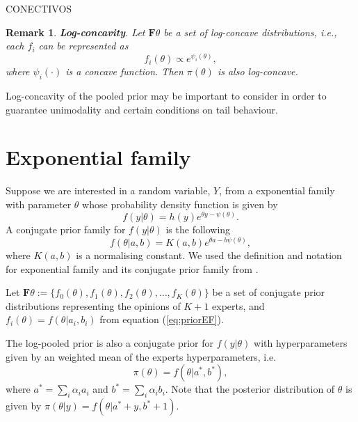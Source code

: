 \documentclass[a4paper, notitlepage, 11pt]{article}
\newtheorem{remark}{Remark}[]
\begin{document}
CONECTIVOS

\begin{remark}
\label{rmk:concavity}
\textbf{Log-concavity}. 
 Let $\mathbf{F}{\theta}$ be a set of log-concave distributions, i.e., each $f_i$ can be represented as
 \begin{equation}
  \label{eq:logconcavity}
  f_i(\theta) \propto e^{\psi_i(\theta)},
 \end{equation}
where $\psi_i(\cdot)$ is a concave function.
Then $\pi(\theta)$ is also log-concave.
\end{remark}

Log-concavity of the pooled prior may be important to consider in order to guarantee unimodality and certain conditions on tail behaviour.

\section*{Exponential family}%

Suppose we are interested in a random variable, $Y$, from a exponential family with parameter $\theta$ whose probability density function is given by
\begin{equation} \label{eq:exponentialfamily}
f(y|\theta) = h(y) e^{\theta y - \psi(\theta)}.
\end{equation}
A conjugate prior family for $f(y|\theta)$ is the following
\begin{equation} \label{eq:priorEF}
f(\theta | a, b) = K(a,b) e^{\theta a - b \psi(\theta)},
\end{equation}
where $K(a,b)$ is a normalising constant. We used the definition and notation for exponential family and its conjugate prior family from \citet[chapter 3]{robert2001bayesian}.

Let $\mathbf{F}{\theta} := \{f_0(\theta), f_1(\theta), f_2(\theta), \ldots, f_K(\theta)\}$ be a set of conjugate prior distributions representing the opinions of $K+1$ experts, and $f_i(\theta) = f(\theta | a_i, b_i)$ from equation (\ref{eq:priorEF}).

The log-pooled prior is also a conjugate prior for $f(y|\theta)$ with hyperparameters given by an weighted mean of the experts hyperparameters, i.e.
\begin{equation}
\pi(\theta) = f(\theta | a^*, b^*),
\end{equation}
where $a^* = \sum_{i} \alpha_i a_i$ and $b^* = \sum_{i} \alpha_i b_i$. Note that the posterior distribution of $\theta$ is given by $\pi(\theta | y) = f(\theta | a^* + y, b^* + 1)$.
\end{document}
